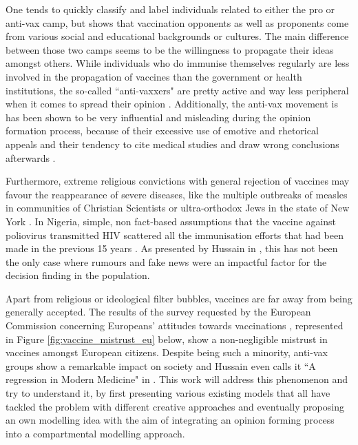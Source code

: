 \documentclass[12pt,a4paper,twoside]{article}
\begin{document}
One tends to quickly classify and label individuals related to either the pro or anti-vax camp, but \cite{Larson2016} shows that vaccination opponents as well as proponents come from various social and educational backgrounds or cultures. The main difference between those two camps seems to be the willingness to propagate their ideas amongst others. While individuals who do immunise themselves regularly are less involved in the propagation of vaccines than the government or health institutions, the so-called ``anti-vaxxers" are pretty active and way less peripheral when it comes to spread their opinion \cite{Johnson2020}. Additionally, the anti-vax movement is has been shown to be very influential and misleading during the opinion formation process, because of their excessive use of emotive and rhetorical appeals and their tendency to cite medical studies and draw wrong conclusions afterwards \cite{Davies2002}.\newline

Furthermore, extreme religious convictions with general rejection of vaccines may favour the reappearance of severe diseases, like the multiple outbreaks of measles in communities of Christian Scientists \cite{Novotny1988} or ultra-orthodox Jews in the state of New York \cite{Health2019}. In Nigeria, simple, non fact-based assumptions that the vaccine against poliovirus transmitted \ac{HIV} scattered all the immunisation efforts that had been made in the previous 15 years \cite{Pincock2004}. As presented by Hussain in \cite{Hussain2018}, this has not been the only case where rumours and fake news were an impactful factor for the decision finding in the population.\newline

Apart from religious or ideological filter bubbles, vaccines are far away from being generally accepted. The results of the survey requested by the European Commission concerning Europeans' attitudes towards vaccinations \cite{KantarBelgium2019}, represented in Figure \ref{fig:vaccine_mistrust_eu} below, show a non-negligible mistrust in vaccines amongst European citizens. Despite being such a minority, anti-vax groups show a remarkable impact on society and Hussain even calls it ``A regression in Modern Medicine" in \cite{Hussain2018}. This work will address this phenomenon and try to understand it, by first presenting various existing models that all have tackled the problem with different creative approaches and eventually proposing an own modelling idea with the aim of integrating an opinion forming process into a compartmental modelling approach.
\end{document}
